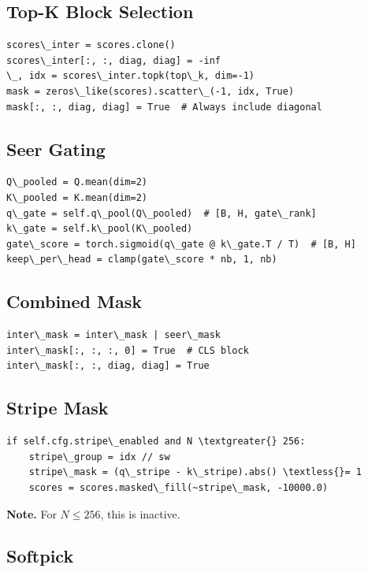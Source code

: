 \subsection{Top-K Block Selection}

\begin{lstlisting}
scores\_inter = scores.clone()
scores\_inter[:, :, diag, diag] = -inf
\_, idx = scores\_inter.topk(top\_k, dim=-1)
mask = zeros\_like(scores).scatter\_(-1, idx, True)
mask[:, :, diag, diag] = True  # Always include diagonal
\end{lstlisting}

\subsection{Seer Gating}

\begin{lstlisting}
Q\_pooled = Q.mean(dim=2)
K\_pooled = K.mean(dim=2)
q\_gate = self.q\_pool(Q\_pooled)  # [B, H, gate\_rank]
k\_gate = self.k\_pool(K\_pooled)
gate\_score = torch.sigmoid(q\_gate @ k\_gate.T / T)  # [B, H]
keep\_per\_head = clamp(gate\_score * nb, 1, nb)
\end{lstlisting}

\subsection{Combined Mask}

\begin{lstlisting}
inter\_mask = inter\_mask | seer\_mask
inter\_mask[:, :, :, 0] = True  # CLS block
inter\_mask[:, :, diag, diag] = True
\end{lstlisting}

\subsection{Stripe Mask}

\begin{lstlisting}
if self.cfg.stripe\_enabled and N \textgreater{} 256:
    stripe\_group = idx // sw
    stripe\_mask = (q\_stripe - k\_stripe).abs() \textless{}= 1
    scores = scores.masked\_fill(~stripe\_mask, -10000.0)
\end{lstlisting}

\textbf{Note.} For $N \leq 256$, this is inactive.

\subsection{Softpick}

